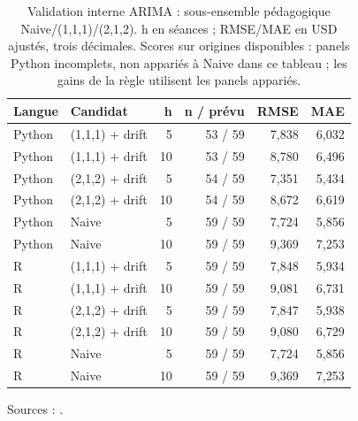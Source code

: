 \begin{table}[!htbp]
\centering
\caption{Validation interne ARIMA : sous-ensemble pédagogique Naive/(1,1,1)/(2,1,2). h en séances ; RMSE/MAE en USD ajustés, trois décimales. Scores sur origines disponibles : panels Python incomplets, non appariés à Naive dans ce tableau ; les gains de la règle utilisent les panels appariés.}
\label{tab:arima_validation}
\small
\setlength{\tabcolsep}{4pt}
\renewcommand{\arraystretch}{1.16}
\begin{tabularx}{\linewidth}{lXrrrr}
\toprule
\textbf{Langue} & \textbf{Candidat} & \textbf{h} & \textbf{n / prévu} & \textbf{RMSE} & \textbf{MAE} \\
\midrule
Python & (1,1,1) + drift & 5 & 53 / 59 & 7,838 & 6,032 \\
Python & (1,1,1) + drift & 10 & 53 / 59 & 8,780 & 6,496 \\
Python & (2,1,2) + drift & 5 & 54 / 59 & 7,351 & 5,434 \\
Python & (2,1,2) + drift & 10 & 54 / 59 & 8,672 & 6,619 \\
Python & Naive & 5 & 59 / 59 & 7,724 & 5,856 \\
Python & Naive & 10 & 59 / 59 & 9,369 & 7,253 \\
R & (1,1,1) + drift & 5 & 59 / 59 & 7,848 & 5,934 \\
R & (1,1,1) + drift & 10 & 59 / 59 & 9,081 & 6,731 \\
R & (2,1,2) + drift & 5 & 59 / 59 & 7,847 & 5,938 \\
R & (2,1,2) + drift & 10 & 59 / 59 & 9,080 & 6,729 \\
R & Naive & 5 & 59 / 59 & 7,724 & 5,856 \\
R & Naive & 10 & 59 / 59 & 9,369 & 7,253 \\
\bottomrule
\end{tabularx}
\par\smallskip
\begin{minipage}{\linewidth}\footnotesize Sources : .
\end{minipage}
\end{table}
